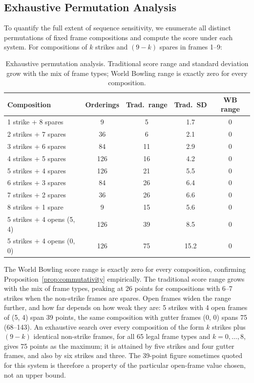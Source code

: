 \documentclass[USenglish]{article}
\theoremstyle{dgthm}
\theoremstyle{dgdef}
\begin{document}
\subsection{Exhaustive Permutation Analysis}

To quantify the full extent of sequence sensitivity, we enumerate all distinct permutations of fixed frame compositions and compute the score under each system. For compositions of $k$ strikes and $(9-k)$ spares in frames 1--9:

\begin{table}[!ht]
\caption{Exhaustive permutation analysis. Traditional score range and standard deviation grow with the mix of frame types; World Bowling range is exactly zero for every composition.}
\begin{tabular}{lcccc}
Composition & Orderings & Trad.\ range & Trad.\ SD & WB range \\ \midrule
1 strike + 8 spares & 9 & 5 & 1.7 & 0 \\
2 strikes + 7 spares & 36 & 6 & 2.1 & 0 \\
3 strikes + 6 spares & 84 & 11 & 2.9 & 0 \\
4 strikes + 5 spares & 126 & 16 & 4.2 & 0 \\
5 strikes + 4 spares & 126 & 21 & 5.5 & 0 \\
6 strikes + 3 spares & 84 & 26 & 6.4 & 0 \\
7 strikes + 2 spares & 36 & 26 & 6.6 & 0 \\
8 strikes + 1 spare & 9 & 15 & 5.6 & 0 \\
5 strikes + 4 opens (5, 4) & 126 & 39 & 8.5 & 0 \\
5 strikes + 4 opens (0, 0) & 126 & 75 & 15.2 & 0 \\
\end{tabular}
\label{tab:permutations}
\end{table}

The World Bowling score range is exactly zero for every composition, confirming Proposition~\ref{prop:commutativity} empirically. The traditional score range grows with the mix of frame types, peaking at 26 points for compositions with 6--7 strikes when the non-strike frames are spares. Open frames widen the range further, and how far depends on how weak they are: 5 strikes with 4 open frames of (5, 4) span 39 points, the same composition with gutter frames (0, 0) spans 75 (68--143). An exhaustive search over every composition of the form $k$ strikes plus $(9-k)$ identical non-strike frames, for all 65 legal frame types and $k = 0, \ldots, 8$, gives 75 points as the maximum; it is attained by five strikes and four gutter frames, and also by six strikes and three. The 39-point figure sometimes quoted for this system is therefore a property of the particular open-frame value chosen, not an upper bound.
\end{document}
